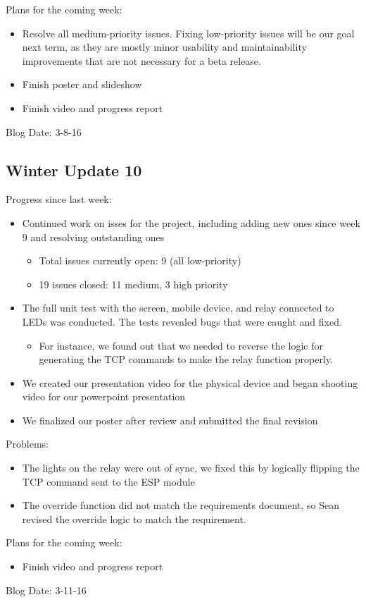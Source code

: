 Plans for the coming week:
\begin{itemize}
   \item Resolve all medium-priority issues.  Fixing low-priority issues will be our goal next term, as they are mostly minor usability and maintainability improvements that are not necessary for a beta release.
   \item Finish poster and slideshow
   \item Finish video and progress report
\end{itemize}
Blog Date: 3-8-16

\subsection{Winter Update 10}
Progress since last week:
\begin{itemize}
   \item Continued work on isses for the project, including adding new ones since week 9 and resolving outstanding ones
      \begin{itemize}
         \item Total issues currently open: 9 (all low-priority)
         \item 19 issues closed: 11 medium, 3 high priority
      \end{itemize}
   \item The full unit test with the screen, mobile device, and relay connected to LEDs was conducted. The tests revealed bugs that were caught and fixed.
      \begin{itemize}
         \item For instance, we found out that we needed to reverse the logic for generating the TCP commands to make the relay function properly.
      \end{itemize}
   \item We created our presentation video for the physical device and began shooting video for our powerpoint presentation
   \item We finalized our poster after review and submitted the final revision
\end{itemize}
Problems:
\begin{itemize}
   \item The lights on the relay were out of sync, we fixed this by logically flipping the TCP command sent to the ESP module
   \item The override function did not match the requirements document, so Sean revised the override logic to match the requirement.
\end{itemize}
Plans for the coming week:
\begin{itemize}
   \item Finish video and progress report
\end{itemize}
Blog Date: 3-11-16

